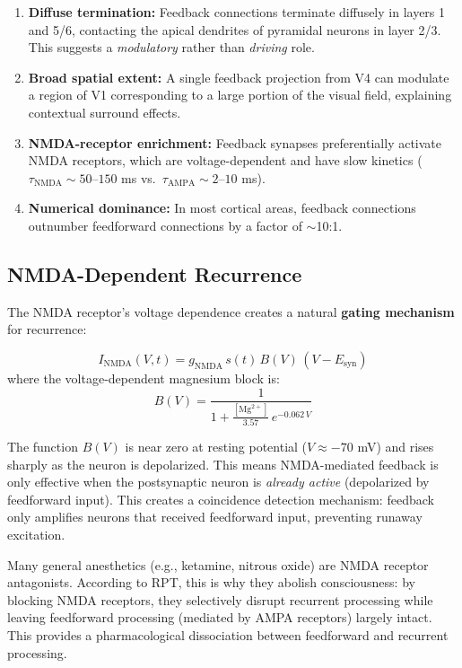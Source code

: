 \documentclass[11pt,a4paper]{report}
\begin{document}
\begin{mechbox}
\begin{enumerate}[leftmargin=1.5em]
  \item \textbf{Diffuse termination:} Feedback connections terminate diffusely in layers 1 and 5/6, contacting the apical dendrites of pyramidal neurons in layer 2/3. This suggests a \emph{modulatory} rather than \emph{driving} role.
  \item \textbf{Broad spatial extent:} A single feedback projection from V4 can modulate a region of V1 corresponding to a large portion of the visual field, explaining contextual surround effects.
  \item \textbf{NMDA-receptor enrichment:} Feedback synapses preferentially activate NMDA receptors, which are voltage-dependent and have slow kinetics ($\tau_{\text{NMDA}} \sim 50$--$150$ ms vs.\ $\tau_{\text{AMPA}} \sim 2$--$10$ ms).
  \item \textbf{Numerical dominance:} In most cortical areas, feedback connections outnumber feedforward connections by a factor of $\sim$10:1.
\end{enumerate}
\end{mechbox}

\subsection{NMDA-Dependent Recurrence}

The NMDA receptor's voltage dependence creates a natural \textbf{gating mechanism} for recurrence:

\begin{mathbox}
\vspace{-6pt}
\[
  I_{\text{NMDA}}(V, t) = g_{\text{NMDA}}\, s(t)\, B(V)\, (V - E_{\text{syn}})
\]
where the voltage-dependent magnesium block is:
\[
  B(V) = \frac{1}{1 + \frac{[\text{Mg}^{2+}]}{3.57}\, e^{-0.062\, V}}
\]
\vspace{-8pt}
\end{mathbox}

The function $B(V)$ is near zero at resting potential ($V \approx -70$ mV) and rises sharply as the neuron is depolarized. This means NMDA-mediated feedback is only effective when the postsynaptic neuron is \emph{already active} (depolarized by feedforward input). This creates a coincidence detection mechanism: feedback only amplifies neurons that received feedforward input, preventing runaway excitation.

\begin{notebox}
Many general anesthetics (e.g., ketamine, nitrous oxide) are NMDA receptor antagonists. According to RPT, this is why they abolish consciousness: by blocking NMDA receptors, they selectively disrupt recurrent processing while leaving feedforward processing (mediated by AMPA receptors) largely intact. This provides a pharmacological dissociation between feedforward and recurrent processing.
\end{notebox}
\end{document}
